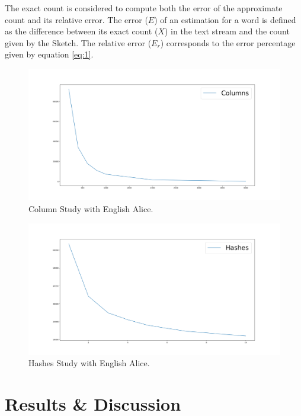 \documentclass[shortpaper]{revdetua}
\begin{document}
The exact count is considered to compute both the error of the approximate count and its relative error.
The error ($E$) of an estimation for a word is defined as the difference between its exact count ($X$) in the text stream and the count given by the Sketch.
The relative error ($E_r$) corresponds to the error percentage given by equation \ref{eq:1}.

\begin{figure}[h]
    \centering
    \setlength{\belowcaptionskip}{-12pt}
    \includegraphics[width=\linewidth]{englishAliceColumnStudy200_4000.png}
    \caption{Column Study with English Alice.} 
    \label{fig:columnStudy}
\end{figure}

\begin{figure}[h]
    \centering
    \setlength{\belowcaptionskip}{-12pt}
    \includegraphics[width=\linewidth]{englishAliceHashesStudy1_10.png}
    \caption{Hashes Study with English Alice.} 
    \label{fig:hashStudy}
\end{figure}

\section{Results \& Discussion} %
\end{document}
